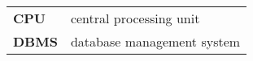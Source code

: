 \myabbrevlist
\begin{tabular}{>{\bfseries}l l}
   CPU & central processing unit\\
   DBMS & database management system\\
\end{tabular}
